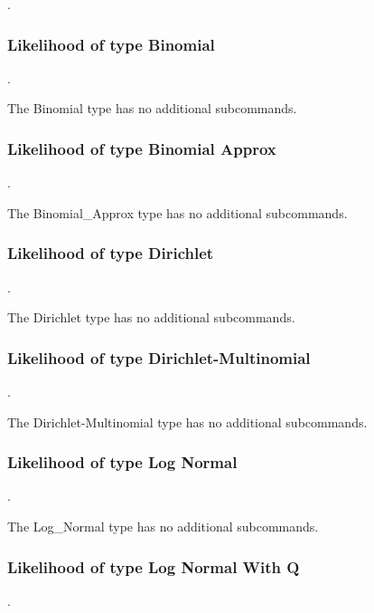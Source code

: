 .
\label{syntax:Likelihood}

\subsubsection{Likelihood of type Binomial}
.
\label{syntax:Likelihood-Binomial}

The Binomial type has no additional subcommands.

\subsubsection{Likelihood of type Binomial Approx}
.
\label{syntax:Likelihood-BinomialApprox}

The Binomial\_Approx type has no additional subcommands.

\subsubsection{Likelihood of type Dirichlet}
.
\label{syntax:Likelihood-Dirichlet}

The Dirichlet type has no additional subcommands.

\subsubsection{Likelihood of type Dirichlet-Multinomial}
.
\label{syntax:Likelihood-Dirichlet-Multinomial}

The Dirichlet-Multinomial type has no additional subcommands.

\subsubsection{Likelihood of type Log Normal}
.
\label{syntax:Likelihood-LogNormal}

The Log\_Normal type has no additional subcommands.

\subsubsection{Likelihood of type Log Normal With Q}
.
\label{syntax:Likelihood-LogNormalWithQ}

